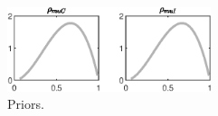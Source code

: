 \begin{figure}[H]
\centering
\includegraphics[width=0.53\textwidth]{BRS_sectoral/graphs/BRS_sectoral_Priors4}
\caption{Priors.}\label{Fig:Priors:4}
\end{figure}
 
